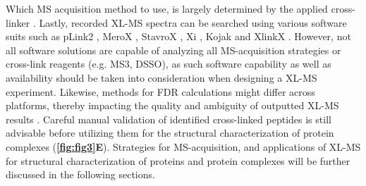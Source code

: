 Which MS acquisition method to use, is largely determined by the applied cross-linker \cite{Liu_2017a}. Lastly, recorded XL-MS spectra can be searched using various software suits such as pLink2 \cite{Chen_2019b}, MeroX \cite{Gotze_2015}, StavroX \cite{Gotze_2012}, Xi \cite{Chen_2019a}, Kojak \cite{Hoopmann_2015} and XlinkX \cite{Klykov_2018}. However, not all software solutions are capable of analyzing all MS-acquisition strategies or cross-link reagents (e.g. MS3, DSSO), as such software capability as well as availability should be taken into consideration when designing a XL-MS experiment. Likewise, methods for FDR calculations might differ across platforms, thereby impacting the quality and ambiguity of outputted XL-MS results \cite{Matzinger_2022}. Careful manual validation of identified cross-linked peptides is still advisable before utilizing them for the structural characterization of protein complexes (\textbf{\autoref{fig:fig3}E}). Strategies for MS-acquisition, and applications of XL-MS for structural characterization of proteins and protein complexes will be further discussed in the following sections.


